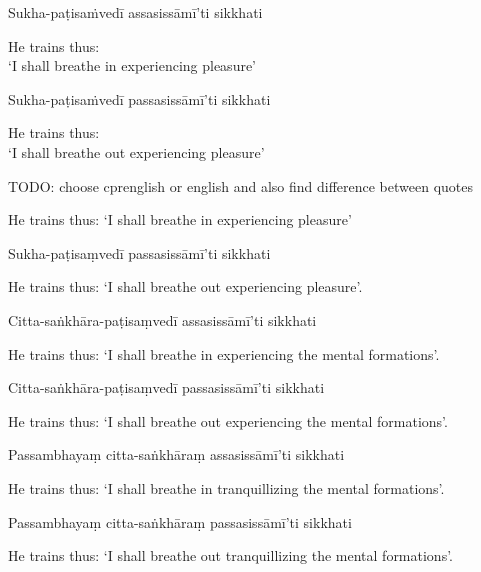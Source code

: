 Sukha-paṭisaṁvedī assasissāmī’ti sikkhati

\begin{cprenglish}
  He trains thus:\\
  ‘I shall breathe in experiencing pleasure’
\end{cprenglish}

Sukha-paṭisaṁvedī passasissāmī’ti sikkhati

\begin{cprenglish}
  He trains thus:\\
  ‘I shall breathe out experiencing pleasure’
\end{cprenglish}

TODO: choose cprenglish or english and also find difference between quotes

\begin{english}
  He trains thus: `I shall breathe in experiencing pleasure'
\end{english}

Sukha-paṭisaṃvedī passasissāmī'ti sikkhati

\begin{english}
  He trains thus: `I shall breathe out experiencing pleasure'.
\end{english}

Citta-saṅkhāra-paṭisaṃvedī assasissāmī'ti sikkhati

\begin{english}
  He trains thus: `I shall breathe in experiencing the mental formations'.
\end{english}

Citta-saṅkhāra-paṭisaṃvedī passasissāmī'ti sikkhati

\begin{english}
  He trains thus: `I shall breathe out experiencing the mental formations'.
\end{english}

Passambhayaṃ citta-saṅkhāraṃ assasissāmī'ti sikkhati

\begin{english}
  He trains thus: `I shall breathe in tranquillizing the mental formations'.
\end{english}

Passambhayaṃ citta-saṅkhāraṃ passasissāmī'ti sikkhati

\begin{english}
  He trains thus: `I shall breathe out tranquillizing the mental formations'.
\end{english}

